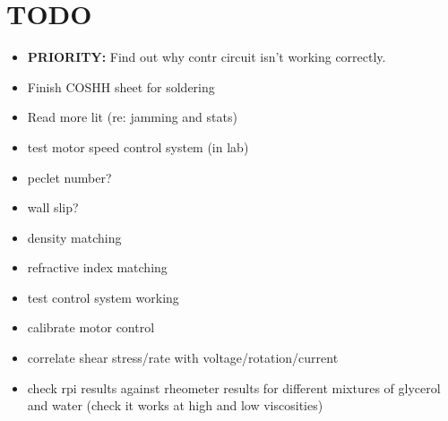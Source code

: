 \documentclass[a4]{report}
\begin{document}
	\section{TODO}
	\begin{itemize}
		\item \textbf{PRIORITY:} Find out why contr circuit isn't working correctly.
		\item Finish COSHH sheet for soldering
		\item Read more lit (re: jamming and stats)
		\item test motor speed control system (in lab)
		\item peclet number?
		\item wall slip?
		\item density matching
		\item refractive index matching
		\item test control system working
		\item calibrate motor control
		\item correlate shear stress/rate with voltage/rotation/current
		\item check rpi results against rheometer results for different mixtures of glycerol and water (check it works at high and low viscosities)
	\end{itemize}
	
\end{document}
